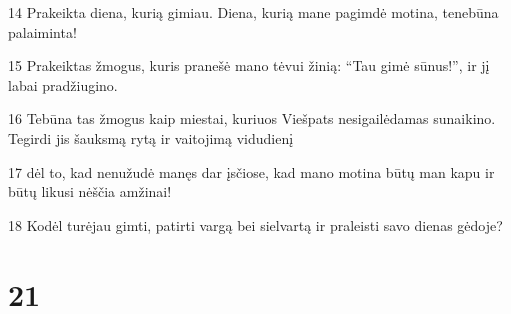 \par 14 Prakeikta diena, kurią gimiau. Diena, kurią mane pagimdė motina, tenebūna palaiminta! 
\par 15 Prakeiktas žmogus, kuris pranešė mano tėvui žinią: “Tau gimė sūnus!”, ir jį labai pradžiugino. 
\par 16 Tebūna tas žmogus kaip miestai, kuriuos Viešpats nesigailėdamas sunaikino. Tegirdi jis šauksmą rytą ir vaitojimą vidudienį 
\par 17 dėl to, kad nenužudė manęs dar įsčiose, kad mano motina būtų man kapu ir būtų likusi nėščia amžinai! 
\par 18 Kodėl turėjau gimti, patirti vargą bei sielvartą ir praleisti savo dienas gėdoje?



\chapter{21}


